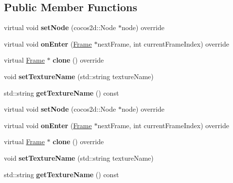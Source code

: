 \subsection*{Public Member Functions}
\begin{DoxyCompactItemize}
\item 
\mbox{\label{classTextureFrame_a64a4752b1200fb84f4d284d0b37b6959}} 
virtual void {\bfseries set\+Node} (cocos2d\+::\+Node $\ast$node) override
\item 
\mbox{\label{classTextureFrame_a14d25e1a48720ce00c5b9dcb4a300258}} 
virtual void {\bfseries on\+Enter} (\hyperlink{classFrame}{Frame} $\ast$next\+Frame, int current\+Frame\+Index) override
\item 
\mbox{\label{classTextureFrame_a801436b29c0c73afadb6299dd2b530c7}} 
virtual \hyperlink{classFrame}{Frame} $\ast$ {\bfseries clone} () override
\item 
\mbox{\label{classTextureFrame_a46a4a9bc95cc6e78e689037510d5b627}} 
void {\bfseries set\+Texture\+Name} (std\+::string texture\+Name)
\item 
\mbox{\label{classTextureFrame_ae175e4d79cb17642b79370cdfd6fbedd}} 
std\+::string {\bfseries get\+Texture\+Name} () const
\item 
\mbox{\label{classTextureFrame_a8f90e476bdcae8061dd467bf8b6d361a}} 
virtual void {\bfseries set\+Node} (cocos2d\+::\+Node $\ast$node) override
\item 
\mbox{\label{classTextureFrame_aa039241e22a68f91f667556a43cbbb9c}} 
virtual void {\bfseries on\+Enter} (\hyperlink{classFrame}{Frame} $\ast$next\+Frame, int current\+Frame\+Index) override
\item 
\mbox{\label{classTextureFrame_a196302fccacd3bfbaa6f6516bf284085}} 
virtual \hyperlink{classFrame}{Frame} $\ast$ {\bfseries clone} () override
\item 
\mbox{\label{classTextureFrame_a46a4a9bc95cc6e78e689037510d5b627}} 
void {\bfseries set\+Texture\+Name} (std\+::string texture\+Name)
\item 
\mbox{\label{classTextureFrame_ae175e4d79cb17642b79370cdfd6fbedd}} 
std\+::string {\bfseries get\+Texture\+Name} () const
\end{DoxyCompactItemize}
